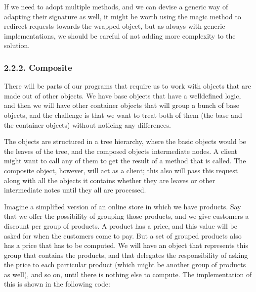 \documentclass[a4paper,10pt,english]{sphinxmanual}
\begin{document}
If we need to adopt multiple methods, and we can devise a generic way of adapting their
signature as well, it might be worth using the  magic method to redirect
requests towards the wrapped object, but as always with generic implementations, we
should be careful of not adding more complexity to the solution.


\subsubsection{2.2.2. Composite}
\label{\detokenize{chapters/9_design_patterns/index:composite}}
There will be parts of our programs that require us to work with objects that are made out
of other objects. We have base objects that have a well\sphinxhyphen{}defined logic, and then we will have
other container objects that will group a bunch of base objects, and the challenge is that we
want to treat both of them (the base and the container objects) without noticing any
differences.

The objects are structured in a tree hierarchy, where the basic objects would be the leaves of
the tree, and the composed objects intermediate nodes. A client might want to call any of
them to get the result of a method that is called. The composite object, however, will act as a
client; this also will pass this request along with all the objects it contains whether they are
leaves or other intermediate notes until they all are processed.

Imagine a simplified version of an online store in which we have products. Say that we
offer the possibility of grouping those products, and we give customers a discount per
group of products. A product has a price, and this value will be asked for when the
customers come to pay. But a set of grouped products also has a price that has to be
computed. We will have an object that represents this group that contains the products, and
that delegates the responsibility of asking the price to each particular product (which might
be another group of products as well), and so on, until there is nothing else to compute. The
implementation of this is shown in the following code:
\end{document}
